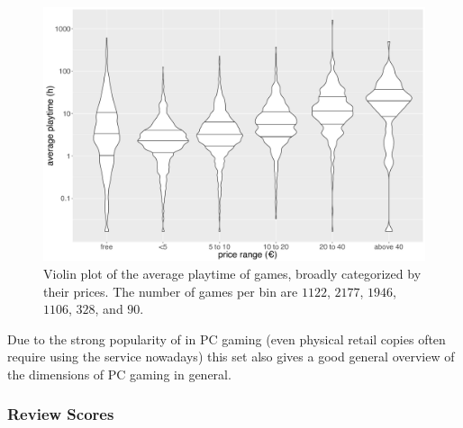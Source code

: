\begin{figure}[!t]
	\centering
	\includegraphics[width=1.0\columnwidth]{images/steam-cost-vs-playtime-non-sale.pdf}
	\caption{Violin plot of the average playtime of \steam games, broadly categorized by their prices. The number of games per bin are $1122$, $2177$, $1946$, $1106$, $328$, and $90$.}
\label{fig:steam-cost-vs-playtime-violin}
\end{figure}



Due to the strong popularity of \steam in PC gaming (even physical retail copies often require using the service nowadays) this set also gives a good general overview of the dimensions of PC gaming in general.



\subsubsection{Review Scores}

